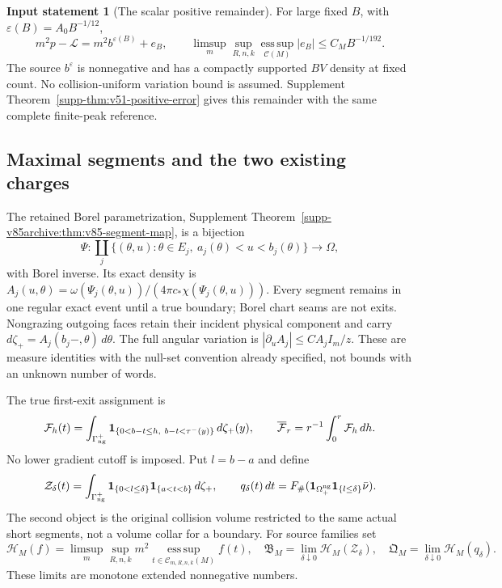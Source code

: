 \documentclass[11pt,reqno]{amsart}
\numberwithin{equation}{section}
\theoremstyle{definition}\newtheorem{definition}[theorem]{Definition}
\theoremstyle{remark}\newtheorem{remark}[theorem]{Remark}
\theoremstyle{definition}\newtheorem{inputstatement}[theorem]{Input statement}
\newcommand{\esssup}{\operatorname*{ess\,sup}}
\begin{document}
\begin{inputstatement}[The scalar positive remainder]
\label{input:v83-scalar}
For large fixed $B$, with $\varepsilon(B)=A_0B^{-1/12}$,
\begin{equation}\label{eq:v76-remainder}
 m^2p-\mathcal L=m^2b^{\varepsilon(B)}+e_B,\qquad
 \limsup_m\sup_{R,n,k}\esssup_{\mathcal C(M)}|e_B|
                                      \le C_MB^{-1/192}.
\end{equation}
The source $b^\varepsilon$ is nonnegative and has a compactly supported
$BV$ density at fixed count. No collision-uniform variation bound is
assumed. Supplement Theorem~\ref{supp-thm:v51-positive-error} gives
this remainder with the same complete finite-peak reference.
\end{inputstatement}

\subsection{Maximal segments and the two existing charges}
The retained Borel parametrization, Supplement
Theorem~\ref{supp-v85archive:thm:v85-segment-map}, is a bijection
\[
 \Psi:\coprod_j\{(\theta,u):\theta\in E_j,\ a_j(\theta)<u<b_j(\theta)\}
                      \longrightarrow\Omega,
\]
with Borel inverse. Its exact density is
$A_j(u,\theta)=\omega(\Psi_j(\theta,u))/(4\pi c_*\chi(\Psi_j(\theta,u)))$.
Every segment remains in one regular exact event until a true boundary;
Borel chart seams are not exits. Nongrazing outgoing faces retain their
incident physical component and carry
$d\zeta_+=A_j(b_j-,\theta)\,d\theta$. The full angular variation is
$|\partial_u A_j|\le C A_j I_m/z$.
These are measure identities with the null-set convention already
specified, not bounds with an unknown number of words.

The true first-exit assignment is
\[
 \mathcal F_h(t)=\int_{\Gamma_{\rm ng}^+}
  \mathbf1_{\{0<b-t\le h,\ b-t<\tau^-(y)\}}\,d\zeta_+(y),\qquad
 \overline{\mathcal F}_r=r^{-1}\int_0^r\mathcal F_h\,dh.
\]
No lower gradient cutoff is imposed. Put $l=b-a$ and define
\[
 \mathcal Z_\delta(t)=\int_{\Gamma_{\rm ng}^+}
       \mathbf1_{\{0<l\le\delta\}}\mathbf1_{\{a<t<b\}}\,d\zeta_+,
 \qquad q_\delta(t)\,dt
  =F_\#(\mathbf1_{\Omega_+^{\rm ng}}\mathbf1_{\{l\le\delta\}}\bar\nu).
\]
The second object is the original collision volume restricted to the
same actual short segments, not a volume collar for a boundary.
For source families set
\[
 \mathcal H_M(f)=\limsup_m\sup_{R,n,k}m^2
            \esssup_{t\in\mathcal C_{m,R,n,k}(M)}f(t),
 \quad \mathfrak B_M=\lim_{\delta\downarrow0}\mathcal H_M(\mathcal Z_\delta),
 \quad \mathfrak Q_M=\lim_{\delta\downarrow0}\mathcal H_M(q_\delta).
\]
These limits are monotone extended nonnegative numbers.
\end{document}

